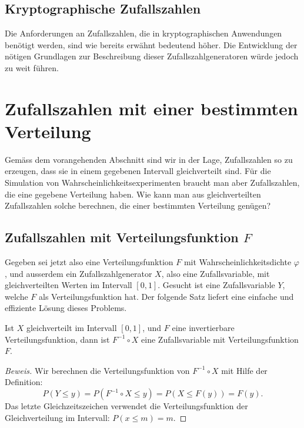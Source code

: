 \subsection{Kryptographische Zufallszahlen}
Die Anforderungen an Zufallszahlen, die in kryptographischen Anwendungen
benötigt werden, sind wie bereits erwähnt bedeutend höher.
Die Entwicklung
der nötigen Grundlagen zur Beschreibung dieser Zufallszahlgeneratoren
würde jedoch zu weit führen.

\section{Zufallszahlen mit einer bestimmten Verteilung}
Gemäss dem vorangehenden Abschnitt sind wir in der Lage, 
Zufallszahlen so zu erzeugen, dass sie in einem gegebenen Intervall
gleichverteilt sind.
Für die Simulation von Wahrscheinlichkeitsexperimenten
braucht man aber Zufallszahlen, die eine gegebene Verteilung haben.
Wie kann man aus gleichverteilten Zufallszahlen solche berechnen,
die einer bestimmten Verteilung genügen?

\subsection{Zufallszahlen mit Verteilungsfunktion \texorpdfstring{$F$}{F}}
Gegeben sei jetzt also eine Verteilungsfunktion $F$ mit
Wahrscheinlichkeitsdichte $\varphi$, und ausserdem ein Zufallszahlgenerator
$X$, also eine Zufallsvariable, mit gleichverteilten Werten im Intervall
$[0,1]$.
Gesucht ist eine Zufallsvariable $Y$, welche $F$ als
Verteilungsfunktion hat.
Der folgende Satz liefert eine
einfache und effiziente Lösung dieses Problems.

\begin{satz}Ist $X$ gleichverteilt im Intervall $[0,1]$, und $F$ eine
invertierbare
Verteilungsfunktion, dann ist $F^{-1}\circ X$ eine Zufallsvariable
mit Verteilungsfunktion $F$.
\end{satz}
\begin{proof}[Beweis]
Wir berechnen die Verteilungsfunktion von $F^{-1}\circ X$ mit Hilfe
der Definition:
\begin{equation}
P(Y\le y)=P(F^{-1}\circ X\le y)=P(X\le F(y))=F(y).
\end{equation}
Das letzte Gleichzeitszeichen verwendet die Verteilungsfunktion der 
Gleichverteilung im Intervall: $P(x\le m)=m$.
\end{proof}

